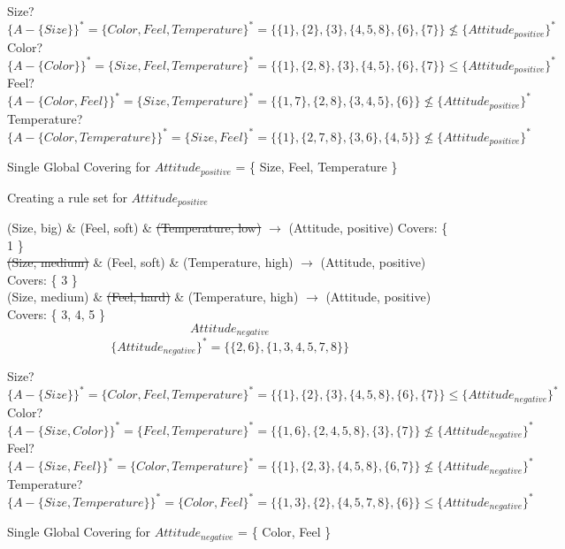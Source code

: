\documentclass[10pt]{amsart}
\begin{document}
Size?  $\{A - \{Size\}\}^* = \{Color, Feel, Temperature\}^* = \{ \{ 1 \}, \{ 2 \}, \{ 3 \}, \{ 4, 5, 8 \}, \{ 6 \}, \{ 7 \} \} \nleq \{ Attitude_{positive} \}^* $ \\
Color? $\{A - \{Color\}\}^* = \{Size, Feel, Temperature\}^* = \{ \{ 1 \}, \{ 2, 8 \}, \{ 3 \}, \{ 4, 5 \}, \{ 6 \}, \{ 7 \} \} \leq \{ Attitude_{positive} \}^* $ \\
Feel? $\{A - \{Color, Feel\}\}^* = \{Size, Temperature\}^* = \{ \{ 1, 7 \}, \{ 2, 8 \}, \{ 3, 4, 5 \}, \{ 6 \} \} \nleq \{ Attitude_{positive} \}^* $ \\
Temperature? $\{A - \{Color, Temperature\}\}^* = \{Size, Feel\}^* = \{ \{ 1 \}, \{ 2, 7, 8 \}, \{ 3, 6 \}, \{ 4, 5 \} \} \nleq \{ Attitude_{positive} \}^* $

Single Global Covering for $Attitude_{positive}$ = \{ Size, Feel, Temperature \}

\begin{center}Creating a rule set for $Attitude_{positive}$\end{center}

(Size, big) \& (Feel, soft) \& \sout{(Temperature, low)} $\rightarrow$ (Attitude, positive) \qquad Covers: \{ 1 \}\\
\sout{(Size, medium)} \& (Feel, soft) \& (Temperature, high) $\rightarrow$ (Attitude, positive) \qquad Covers: \{ 3 \} \\
(Size, medium) \& \sout{(Feel, hard)} \& (Temperature, high) $\rightarrow$ (Attitude, positive) \qquad Covers: \{ 3, 4, 5 \} \\

$$Attitude_{negative}$$
$$\{ Attitude_{negative} \}^* = \{ \{ 2, 6 \} , \{ 1, 3, 4, 5, 7, 8 \} \}$$

Size?  $\{A - \{Size\}\}^* = \{Color, Feel, Temperature\}^* = \{ \{ 1 \}, \{ 2 \}, \{ 3 \}, \{ 4, 5, 8 \}, \{ 6 \}, \{ 7 \} \} \leq \{ Attitude_{negative} \}^* $ \\
Color? $\{A - \{Size, Color\}\}^* = \{Feel, Temperature\}^* = \{ \{ 1, 6 \}, \{ 2, 4, 5, 8 \}, \{ 3 \}, \{ 7 \}  \} \nleq \{ Attitude_{negative} \}^* $ \\
Feel? $\{A - \{ Size, Feel\}\}^* = \{Color, Temperature\}^* = \{ \{ 1 \}, \{ 2, 3 \}, \{ 4, 5, 8 \}, \{ 6, 7 \} \} \nleq \{ Attitude_{negative} \}^* $ \\
Temperature? $\{A - \{Size, Temperature\}\}^* = \{Color, Feel\}^* = \{ \{ 1, 3 \}, \{ 2 \}, \{ 4, 5, 7, 8 \}, \{ 6 \} \} \leq \{ Attitude_{negative} \}^* $

Single Global Covering for $Attitude_{negative}$ = \{ Color, Feel \}
\end{document}
